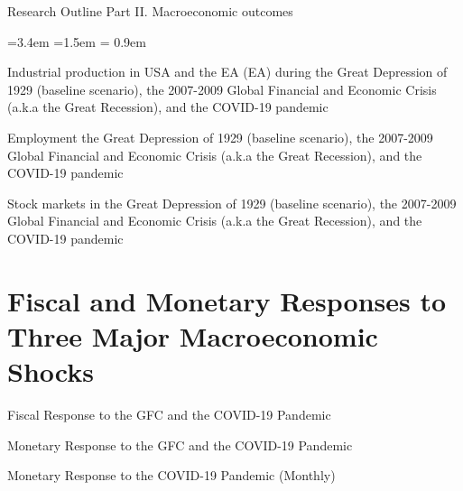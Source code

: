 \documentclass{beamer}
\begin{document}
\begin{frame}{Research Outline}
Part II. Macroeconomic outcomes
\begin{list}{\faChevronCircleRight}{\leftmargin=3.4em =1.5em 
\itemsep = 0.9em}
\item [\ding{202}] Industrial production in USA and the EA (EA) during the Great Depression of 1929 (baseline scenario), the 2007-2009 Global Financial and Economic Crisis (a.k.a the Great Recession), and the COVID-19 pandemic
\item [\ding{203}] Employment the Great Depression of 1929 (baseline scenario), the 2007-2009 Global Financial and Economic Crisis (a.k.a the Great Recession), and the COVID-19 pandemic
\item [\ding{204}] Stock markets in the Great Depression of 1929 (baseline scenario), the 2007-2009 Global Financial and Economic Crisis (a.k.a the Great Recession), and the COVID-19 pandemic

\end{list}	
\end{frame}


\section{Fiscal and Monetary Responses to Three Major Macroeconomic Shocks}

\begin{frame}{Fiscal Response to the GFC and the COVID-19 Pandemic}

\begin{figure}[h!]
     \centering
     
\end{figure} 
	
\end{frame}

\begin{frame}{Monetary Response to the GFC and the COVID-19 Pandemic}

\begin{figure}[h!]
     \centering
     
\end{figure} 
	
\end{frame}

\begin{frame}{Monetary Response to the COVID-19 Pandemic (Monthly)}

\begin{figure}[h!]
     \centering
     
\end{figure} 
	
\end{frame}
\end{document}
